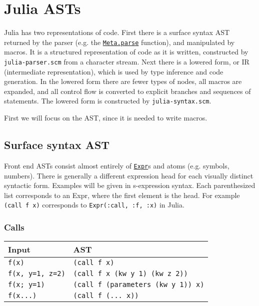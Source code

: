 \hypertarget{16235973380684375384}{}


\section{Julia ASTs}



Julia has two representations of code. First there is a surface syntax AST returned by the parser (e.g. the \hyperlink{9794549254908071788}{\texttt{Meta.parse}} function), and manipulated by macros. It is a structured representation of code as it is written, constructed by \texttt{julia-parser.scm} from a character stream. Next there is a lowered form, or IR (intermediate representation), which is used by type inference and code generation. In the lowered form there are fewer types of nodes, all macros are expanded, and all control flow is converted to explicit branches and sequences of statements. The lowered form is constructed by \texttt{julia-syntax.scm}.



First we will focus on the AST, since it is needed to write macros.



\hypertarget{6198433338459689204}{}


\subsection{Surface syntax AST}



Front end ASTs consist almost entirely of \hyperlink{17120496304147995299}{\texttt{Expr}}s and atoms (e.g. symbols, numbers). There is generally a different expression head for each visually distinct syntactic form. Examples will be given in s-expression syntax. Each parenthesized list corresponds to an Expr, where the first element is the head. For example \texttt{(call f x)} corresponds to \texttt{Expr(:call, :f, :x)} in Julia.



\hypertarget{13191950853363974893}{}


\subsubsection{Calls}




\begin{table}[h]

\begin{tabulary}{\linewidth}{|L|L|}
\hline
Input & AST \\
\hline
\texttt{f(x)} & \texttt{(call f x)} \\
\hline
\texttt{f(x, y=1, z=2)} & \texttt{(call f x (kw y 1) (kw z 2))} \\
\hline
\texttt{f(x; y=1)} & \texttt{(call f (parameters (kw y 1)) x)} \\
\hline
\texttt{f(x...)} & \texttt{(call f (... x))} \\
\hline
\end{tabulary}

\end{table}



